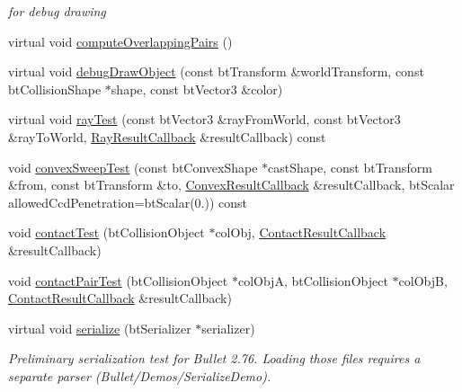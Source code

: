 \begin{CompactItemize}
\begin{CompactList}\small\item\em for debug drawing \item\end{CompactList}\item 
virtual void \hyperlink{classbt_collision_world_fb32fb7ecb40aa6247fd3df18ba81098}{computeOverlappingPairs} ()
\item 
virtual void \hyperlink{classbt_collision_world_c1ca6489c220005798069152c3df0d08}{debugDrawObject} (const btTransform \&worldTransform, const btCollisionShape $\ast$shape, const btVector3 \&color)
\item 
virtual void \hyperlink{classbt_collision_world_aac6675c8134f6695fecb431c72b0a6a}{rayTest} (const btVector3 \&rayFromWorld, const btVector3 \&rayToWorld, \hyperlink{structbt_collision_world_1_1_ray_result_callback}{RayResultCallback} \&resultCallback) const 
\item 
void \hyperlink{classbt_collision_world_eeee096b94a5eb31e8c88a29b6c69d37}{convexSweepTest} (const btConvexShape $\ast$castShape, const btTransform \&from, const btTransform \&to, \hyperlink{structbt_collision_world_1_1_convex_result_callback}{ConvexResultCallback} \&resultCallback, btScalar allowedCcdPenetration=btScalar(0.)) const 
\item 
void \hyperlink{classbt_collision_world_e1d167b53de82d4f97a47118f8480999}{contactTest} (btCollisionObject $\ast$colObj, \hyperlink{structbt_collision_world_1_1_contact_result_callback}{ContactResultCallback} \&resultCallback)
\item 
void \hyperlink{classbt_collision_world_abbec542dcd348041db6d07b36a640c8}{contactPairTest} (btCollisionObject $\ast$colObjA, btCollisionObject $\ast$colObjB, \hyperlink{structbt_collision_world_1_1_contact_result_callback}{ContactResultCallback} \&resultCallback)
\item 
\hypertarget{classbt_collision_world_152b79ca83fdb13ed7f1cc86ac214f66}{
virtual void \hyperlink{classbt_collision_world_152b79ca83fdb13ed7f1cc86ac214f66}{serialize} (btSerializer $\ast$serializer)}
\label{classbt_collision_world_152b79ca83fdb13ed7f1cc86ac214f66}

\begin{CompactList}\small\item\em Preliminary serialization test for Bullet 2.76. Loading those files requires a separate parser (Bullet/Demos/SerializeDemo). \item\end{CompactList}\end{CompactItemize}
